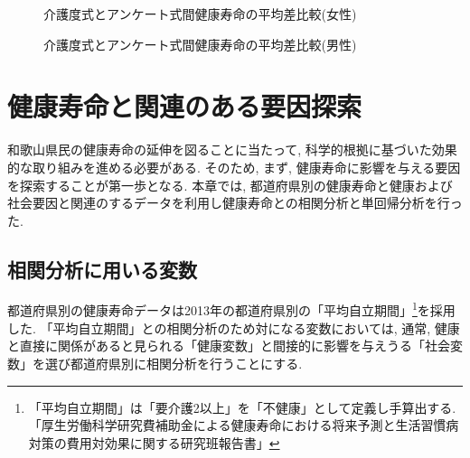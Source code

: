 \begin{figure}[h!]
	\begin{center}
		\caption{介護度式とアンケート式間健康寿命の平均差比較(女性)}
	\end{center}
\end{figure}

\begin{figure}[h!]
	\begin{center}
		\caption{介護度式とアンケート式間健康寿命の平均差比較(男性)}
	\end{center}
\end{figure}




\chapter{健康寿命と関連のある要因探索}

和歌山県民の健康寿命の延伸を図ることに当たって, 科学的根拠に基づいた効果的な取り組みを進める必要がある. そのため, まず, 健康寿命に影響を与える要因を探索することが第一歩となる.
本章では, 都道府県別の健康寿命と健康および社会要因と関連のするデータを利用し健康寿命との相関分析と単回帰分析を行った.

\section{相関分析に用いる変数}
都道府県別の健康寿命データは2013年の都道府県別の「平均自立期間」\footnote{「平均自立期間」は「要介護2以上」を「不健康」として定義し手算出する. 「厚生労働科学研究費補助金による健康寿命における将来予測と生活習慣病対策の費用対効果に関する研究班報告書」}を採用した. 「平均自立期間」との相関分析のため対になる変数においては, 通常, 健康と直接に関係があると見られる「健康変数」と間接的に影響を与えうる「社会変数」を選び都道府県別に相関分析を行うことにする.

